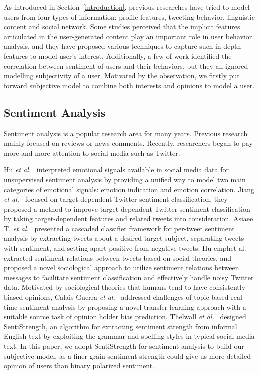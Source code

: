 \documentclass{acm_proc_article-sp}
\begin{document}
As introduced in Section~\ref{introduction}, previous researches have tried to model users from four types of information: profile features, tweeting behavior, linguistic content and social network. 
Some studies perceived that the implicit features articulated in the user-generated content play an important role in user behavior analysis, and they have proposed various techniques to capture such in-depth features to model user's interest. 
Additionally, a few of work identified the correlation between sentiment of users and their behaviors, but they all ignored modelling subjectivity of a user.
Motivated by the observation, we firstly put forward subjective model to combine both interests and opinions to model a user.

\subsection{Sentiment Analysis}
Sentiment analysis is a popular research area for many years. Previous research mainly focused on reviews or news comments. 
Recently, researchers began to pay more and more attention to social media such as Twitter.
 
Hu \emph{et al.}~\cite{hu2013unsupervised} interpreted emotional signals available in social media data for unsupervised sentiment analysis by providing a unified way to model two main categories of emotional signals: emotion indication and emotion correlation. 
Jiang \emph{et al.}~\cite{jiang2011target} focused on target-dependent Twitter sentiment classification, they proposed a method to improve target-dependent Twitter sentiment classification by taking target-dependent features and related tweets into consideration. 
Asiaee T. \emph{et al.}~\cite{asiaee2012if} presented a cascaded classifier framework for per-tweet sentiment analysis by extracting tweets about a desired target subject, separating tweets with sentiment, and setting apart positive from negative tweets.
Hu emph{et al.}~\cite{hu2013exploiting} extracted sentiment relations between tweets based on social theories, and proposed a novel sociological approach to utilize sentiment relations between messages to facilitate sentiment classification and effectively handle noisy Twitter data.
Motivated by sociological theories that humans tend to have consistently biased opinions, Calais Guerra \emph{et al.}~\cite{calais2011bias} addressed challenges of topic-based real-time sentiment analysis by proposing a novel transfer learning approach with a suitable source task of opinion holder bias prediction.
Thelwall \emph{et al.}~\cite{thelwall2010sentiment,thelwall2012sentiment} designed SentiStrength, an algorithm for extracting sentiment strength from informal English text by exploiting the grammar and spelling styles in typical social media text.
In this paper, we adopt SentiStrength for sentiment analysis to build our subjective model, as a finer grain sentiment strength could give us more detailed opinion of users than binary polarized sentiment.
\end{document}
